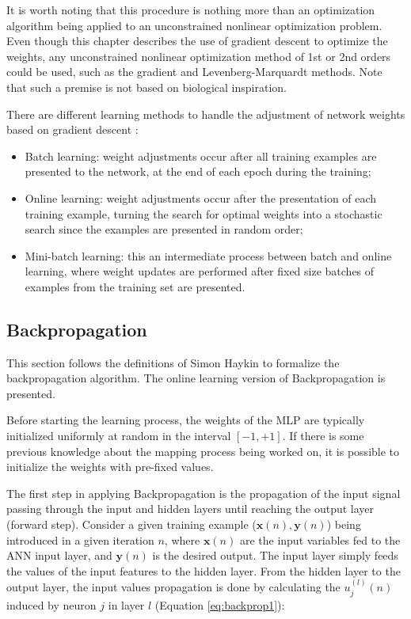 It is worth noting that this procedure is nothing more than an optimization algorithm being applied to an unconstrained nonlinear optimization problem. Even though this chapter describes the use of gradient descent to optimize the weights, any unconstrained nonlinear optimization method of 1st or 2nd orders could be used, such as the gradient and Levenberg-Marquardt methods. Note that such a premise is not based on biological inspiration.

There are different learning methods to handle the adjustment of network weights based on gradient descent \cite{haykin, Bengio2012}:

\begin{itemize}
	\item Batch learning: weight adjustments occur after all training examples are presented to the network, at the end of each epoch during the training;
	\item Online learning: weight adjustments occur after the presentation of each training example, turning the search for optimal weights into a stochastic search since the examples are presented in random order;
	\item Mini-batch learning: this an intermediate process between batch and online learning, where weight updates are performed after fixed size batches of examples from the training set are presented.
\end{itemize}

\subsection{Backpropagation}
\label{ssec:Pseudocodigo}

This section follows the definitions of Simon Haykin \cite{haykin} to formalize the backpropagation algorithm. The online learning version of Backpropagation is presented.

Before starting the learning process, the weights of the MLP are typically initialized uniformly at random in the interval $[-1,+1]$. If there is some previous knowledge about the mapping process being worked on, it is possible to initialize the weights with pre-fixed values.  

The first step in applying Backpropagation is the propagation of the input signal passing through the input and hidden layers until reaching the output layer (forward step). 
Consider a given training example ($\mathbf{x}(n), \mathbf{y}(n)$) being introduced in a given iteration $n$, where $\mathbf{x}(n)$ are the input variables fed to the ANN input layer, and $\mathbf{y}(n)$ is the desired output. The input layer simply feeds the values of the input features to the hidden layer. From the hidden layer to the output layer, the input values propagation is done by calculating the $u_j^{(l)}(n)$  induced by neuron $j$ in layer $l$ (Equation \ref{eq:backprop1}):


